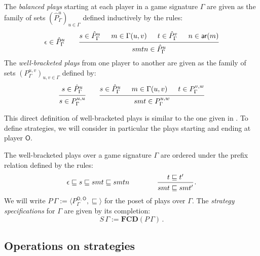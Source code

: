 \documentclass[sigplan,10pt,review,anonymous]{acmart}
\newcommand{\kw}[1]{\ensuremath{ \mathsf{#1} }}
\begin{document}
\begin{definition}
The \emph{balanced plays}
starting at each player in
a game signature $\Gamma$
are given
as the family of sets
$(\hat{P}_\Gamma^u)_{u \in \Gamma}$
defined inductively by the rules:
\[
  \epsilon \in \hat{P}_\Gamma^u
  \qquad
  \begin{prooftree}
    \hypo{s \in \hat{P}_\Gamma^u}
    \hypo{m \in \Gamma(u, v)}
    \hypo{t \in \hat{P}_\Gamma^v}
    \hypo{n \in \kw{ar}(m)}
    \infer4{smtn \in \hat{P}_\Gamma^u}
  \end{prooftree}
\]
The \emph{well-bracketed plays}
from one player to another
are given as the family of sets
$(P_\Gamma^{u,v})_{u,v \in \Gamma}$
defined by:
\[
  \begin{prooftree}
    \hypo{s \in \hat{P}_\Gamma^u}
    \infer1{s \in P_\Gamma^{u,u}}
  \end{prooftree}
  \qquad
  \begin{prooftree}
    \hypo{s \in \hat{P}_\Gamma^u}
    \hypo{m \in \Gamma(u, v)}
    \hypo{t \in P_\Gamma^{v,w}}
    \infer3{smt \in P_\Gamma^{u,w}}
  \end{prooftree}
\]
\end{definition}

This direct definition of well-bracketed plays
is similar to the one given in \cite{mwjava}.
To define strategies,
we will consider in particular the plays
starting and ending at player $\kw{O}$.

\begin{definition}
The well-bracketed plays over a game signature $\Gamma$
are ordered under the prefix relation
defined by the rules:
\[
  \epsilon \sqsubseteq s \sqsubseteq smt \sqsubseteq smtn
  \qquad \qquad
  \begin{prooftree}
    \hypo{t \sqsubseteq t'}
    \infer1{smt \sqsubseteq smt'}
  \end{prooftree} \,.
\]
We will write
$P \, \Gamma := \langle P_\Gamma^{\kw{O},\kw{O}}, {\sqsubseteq} \rangle$
for the poset of plays over $\Gamma$.
The \emph{strategy specifications} for $\Gamma$
are given by its completion:
\[
    S \, \Gamma := \mathbf{FCD}(P \, \Gamma) \,.
\]
\end{definition}


\subsection{Operations on strategies} %
\end{document}
